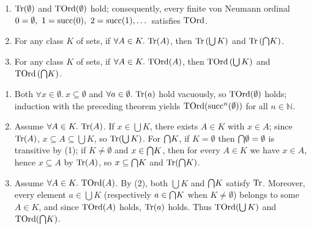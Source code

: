 \documentclass[10pt,a4paper]{article}
\begin{document}
\begin{theorem}\label{thm:tord_closure}
\begin{enumerate}
\item ${\textrm{Tr}}(\emptyset)$ and ${\textrm{TOrd}}(\emptyset)$ hold; consequently, every finite von Neumann ordinal $0 = \emptyset,\ 1 = {\textrm{succ}}(0),\ 2 = {\textrm{succ}}(1), \dots$ satisfies ${\textrm{TOrd}}$.
\item For any class $K$ of sets, if $\forall A \in K.\ \Tr(A)$, then ${\textrm{Tr}}\left(\bigcup K\right)$ and ${\textrm{Tr}}\left({\bigcap} K\right)$.
\item For any class $K$ of sets, if $\forall A \in K.\ \TOrd(A)$, then ${\textrm{TOrd}}\left(\bigcup K\right)$ and ${\textrm{TOrd}}\left({\bigcap} K\right)$.
\end{enumerate}
\end{theorem}
\myprf
\begin{enumerate}
\item Both $\forall x \in \emptyset.\ x \subseteq \emptyset$ and $\forall a \in \emptyset.\ {\textrm{Tr}}(a)$ hold vacuously, so ${\textrm{TOrd}}(\emptyset)$ holds; induction with the preceding theorem yields ${\textrm{TOrd}}({\textrm{succ}}^n(\emptyset))$ for all $n \in \mathbb{N}$.
\item Assume $\forall A \in K.\ \Tr(A)$. If $x \in \bigcup K$, there exists $A \in K$ with $x \in A$; since ${\textrm{Tr}}(A)$, $x \subseteq A \subseteq \bigcup K$, so ${\textrm{Tr}}(\bigcup K)$. For ${\bigcap} K$, if $K = \emptyset$ then ${\bigcap} \emptyset = \emptyset$ is transitive by (1); if $K \neq \emptyset$ and $x \in {\bigcap} K$, then for every $A \in K$ we have $x \in A$, hence $x \subseteq A$ by ${\textrm{Tr}}(A)$, so $x \subseteq {\bigcap} K$ and ${\textrm{Tr}}({\bigcap} K)$.
\item Assume $\forall A \in K.\ \TOrd(A)$. By (2), both $\bigcup K$ and ${\bigcap} K$ satisfy ${\textrm{Tr}}$. Moreover, every element $a \in \bigcup K$ (respectively $a \in {\bigcap} K$ when $K \neq \emptyset$) belongs to some $A \in K$, and since ${\textrm{TOrd}}(A)$ holds, ${\textrm{Tr}}(a)$ holds. Thus ${\textrm{TOrd}}(\bigcup K)$ and ${\textrm{TOrd}}({\bigcap} K)$.
\end{enumerate}
\myqed
\end{document}
